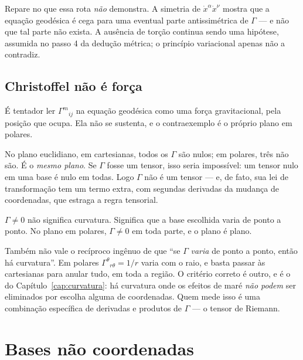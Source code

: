 \documentclass[12pt,a4paper,oneside]{book}
\theoremstyle{rgplain}
\theoremstyle{rgremark}
\begin{document}
\begin{atencao}
Repare no que essa rota \emph{não} demonstra. A simetria de
$\dot x^\alpha\dot x^\nu$ mostra que a equação geodésica é cega para uma
eventual parte antissimétrica de $\Gamma$ --- e não que tal parte não exista.
A ausência de torção continua sendo uma hipótese, assumida no passo 4 da
dedução métrica; o princípio variacional apenas não a contradiz.
\end{atencao}

\subsection*{Christoffel não é força}

É tentador ler $\Gamma^m{}_{ij}$ na equação geodésica como uma força
gravitacional, pela posição que ocupa. Ela não se sustenta, e o
contraexemplo é o próprio plano em polares.

No plano euclidiano, em cartesianas, todos os $\Gamma$ são nulos; em polares,
três não são. É o \emph{mesmo plano}. Se $\Gamma$ fosse um tensor, isso seria
impossível: um tensor nulo em uma base é nulo em todas. Logo $\Gamma$ não é um
tensor --- e, de fato, sua lei de transformação tem um termo extra, com
segundas derivadas da mudança de coordenadas, que estraga a regra tensorial.

\begin{central}
$\Gamma\ne0$ não significa curvatura. Significa que a base escolhida varia de
ponto a ponto. No plano em polares, $\Gamma\ne0$ em toda parte, e o plano é
plano.
\end{central}

\begin{atencao}
Também não vale o recíproco ingênuo de que ``se $\Gamma$ \emph{varia} de ponto
a ponto, então há curvatura''. Em polares $\Gamma^\theta{}_{r\theta}=1/r$ varia
com o raio, e basta passar às cartesianas para anular tudo, em toda a região.
O critério correto é outro, e é o do Capítulo~\ref{cap:curvatura}: há curvatura
onde os efeitos de maré \emph{não podem} ser eliminados por escolha alguma de
coordenadas. Quem mede isso é uma combinação específica de derivadas e produtos
de $\Gamma$ --- o tensor de Riemann.
\end{atencao}

\section{Bases não coordenadas}
\label{sec:bases-nao-coordenadas}
\end{document}
